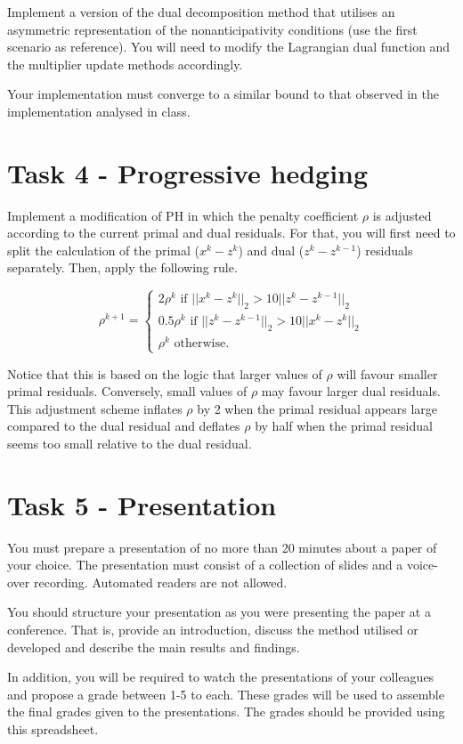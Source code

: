 \documentclass[a4paper]{artikel3}
\begin{document}
Implement a version of the dual decomposition method that utilises an asymmetric representation of the nonanticipativity conditions (use the first scenario as reference). You will need to modify the Lagrangian dual function and the multiplier update methods accordingly. 

Your implementation must converge to a similar bound to that observed in the implementation analysed in class.


\section{Task 4 - Progressive hedging}

Implement a modification of PH in which the penalty coefficient $\rho$ is adjusted according to the current primal and dual residuals. For that, you will first need to split the calculation of the primal ($x^k - z^k$) and dual ($z^k - z^{k-1}$) residuals separately. Then, apply the following rule.

\begin{equation*}
	\rho^{k+1} = \begin{cases}
 					2\rho^{k} \text{ if }||x^k - z^k||_2 > 10 ||z^k - z^{k-1}||_2  \\
 					0.5\rho^{k} \text{ if }||z^k - z^{k-1}||_2 > 10 ||x^k - z^k ||_2  \\
 					\rho^{k} \text{ otherwise.}
 				 \end{cases}
\end{equation*}

Notice that this is based on the logic that larger values of $\rho$ will favour smaller primal residuals. Conversely, small values of $\rho$ may favour larger dual residuals. This adjustment scheme inflates $\rho$ by 2 when the primal residual appears large compared to the dual residual and deflates $\rho$ by half when the primal residual seems too small relative
to the dual residual.

\section{Task 5 - Presentation}

You must prepare a presentation of no more than 20 minutes about a paper of your choice. The presentation must consist of a collection of slides and a voice-over recording. Automated readers are not allowed.

You should structure your presentation as you were presenting the paper at a conference. That is, provide an introduction, discuss the method utilised or developed and describe the main results and findings.

In addition, you will be required to watch the presentations of your colleagues and propose a grade between 1-5 to each. These grades will be used to assemble the final grades given to the presentations. The grades should be provided using this spreadsheet.
\end{document}
